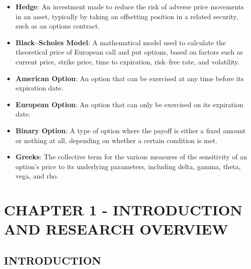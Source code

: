 \documentclass[12pt,a4paper]{report}
\numberwithin{equation}{section}
\begin{document}
\begin{itemize}
\item \textbf{Hedge}: An investment made to reduce the risk of adverse price
movements in an asset, typically by taking an offsetting position in a
related security, such as an options contract.

\item \textbf{Black--Scholes Model}: A mathematical model used to calculate the
theoretical price of European call and put options, based on factors
such as current price, strike price, time to expiration, risk--free rate,
and volatility.

\item \textbf{American Option}: An option that can be exercised at any time before
its expiration date.

\item \textbf{European Option}: An option that can only be exercised on its
expiration date.

\item \textbf{Binary Option}: A type of option where the payoff is either a fixed
amount or nothing at all, depending on whether a certain condition is
met.

\item \textbf{Greeks}: The collective term for the various measures of the
sensitivity of an option's price to its underlying parameters, including
delta, gamma, theta, vega, and rho.
\end{itemize}


\cleardoublepage
{}
\setcounter{page}{1}

\hypertarget{chapter--i}{%
\chapter{\texorpdfstring{\textbf{CHAPTER 1 - INTRODUCTION AND RESEARCH OVERVIEW}
}{CHAPTER I }}\label{chapter--i}}

\hypertarget{introduction}{%
\section{\texorpdfstring{\textbf{INTRODUCTION}}{INTRODUCTION}}\label{introduction}}
\end{document}
